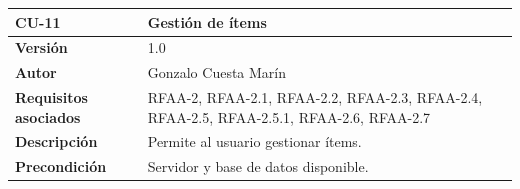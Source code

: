 \documentclass[
]{article}
\begin{document}
\begin{longtable}[]{@{}ll@{}}
\toprule
\begin{minipage}[b]{0.21\columnwidth}\raggedright
\textbf{CU-11}\strut
\end{minipage} & \begin{minipage}[b]{0.73\columnwidth}\raggedright
\textbf{Gestión de ítems}\strut
\end{minipage}\tabularnewline
\midrule
\endhead
\begin{minipage}[t]{0.21\columnwidth}\raggedright
\textbf{Versión}\strut
\end{minipage} & \begin{minipage}[t]{0.73\columnwidth}\raggedright
1.0\strut
\end{minipage}\tabularnewline
\begin{minipage}[t]{0.21\columnwidth}\raggedright
\textbf{Autor}\strut
\end{minipage} & \begin{minipage}[t]{0.73\columnwidth}\raggedright
Gonzalo Cuesta Marín\strut
\end{minipage}\tabularnewline
\begin{minipage}[t]{0.21\columnwidth}\raggedright
\textbf{Requisitos asociados}\strut
\end{minipage} & \begin{minipage}[t]{0.73\columnwidth}\raggedright
RFAA-2, RFAA-2.1, RFAA-2.2, RFAA-2.3, RFAA-2.4, RFAA-2.5, RFAA-2.5.1,
RFAA-2.6, RFAA-2.7\strut
\end{minipage}\tabularnewline
\begin{minipage}[t]{0.21\columnwidth}\raggedright
\textbf{Descripción}\strut
\end{minipage} & \begin{minipage}[t]{0.73\columnwidth}\raggedright
Permite al usuario gestionar ítems.\strut
\end{minipage}\tabularnewline
\begin{minipage}[t]{0.21\columnwidth}\raggedright
\textbf{Precondición}\strut
\end{minipage} & \begin{minipage}[t]{0.73\columnwidth}\raggedright
Servidor y base de datos disponible.


\end{minipage}
\end{longtable}
\end{document}
